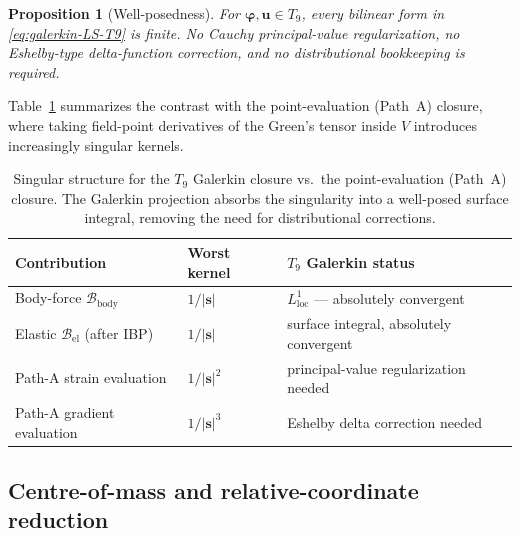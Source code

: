 \documentclass[11pt,a4paper]{article}
\newcommand{\bs}{\bm{s}}
\newcommand{\bu}{\bm{u}}
\newcommand{\bphi}{\bm{\varphi}}
\newcommand{\Lspace}{L^1_{\mathrm{loc}}}
\theoremstyle{plain}
\newtheorem{proposition}[theorem]{Proposition}
\theoremstyle{definition}
\theoremstyle{remark}
\begin{document}
\begin{proposition}[Well-posedness]\label{prop:wellposed-T9}
For $\bphi, \bu \in T_9$, every bilinear form in
\eqref{eq:galerkin-LS-T9} is finite.  No Cauchy principal-value
regularization, no Eshelby-type delta-function correction, and no
distributional bookkeeping is required.
\end{proposition}

Table~\ref{tab:singularities-T9} summarizes the contrast with the
point-evaluation (Path~A) closure, where taking field-point derivatives
of the Green's tensor inside $V$ introduces increasingly singular
kernels.

\begin{table}[h]
\centering
\begin{tabular}{lll}
\toprule
Contribution & Worst kernel & $T_9$ Galerkin status \\
\midrule
Body-force $\mathcal{B}_{\mathrm{body}}$ & $1/|\bs|$ & $\Lspace$ --- absolutely convergent \\
Elastic $\mathcal{B}_{\mathrm{el}}$ (after IBP) & $1/|\bs|$ & surface integral, absolutely convergent \\
Path-A strain evaluation & $1/|\bs|^{2}$ & principal-value regularization needed \\
Path-A gradient evaluation & $1/|\bs|^{3}$ & Eshelby delta correction needed \\
\bottomrule
\end{tabular}
\caption{Singular structure for the $T_9$ Galerkin closure vs.\ the
point-evaluation (Path~A) closure.  The Galerkin projection absorbs the
singularity into a well-posed surface integral, removing the need for
distributional corrections.}
\label{tab:singularities-T9}
\end{table}

\subsection{Centre-of-mass and relative-coordinate reduction}
\label{sec:t9-cm}
\end{document}
